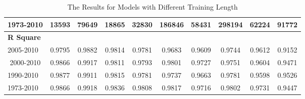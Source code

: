 \documentclass[a4paper,reqno,]{article}
\begin{document}
\begin{enumerate}
\begin{table}[H]
\begin{tabular}{lccccccccc}
    1973-2010 & \cellcolor[rgb]{ .447,  .769,  .533}13593 & \cellcolor[rgb]{ .408,  .753,  .502}79649 & \cellcolor[rgb]{ .388,  .745,  .482}18865 & \cellcolor[rgb]{ .702,  .871,  .753}32830 & \cellcolor[rgb]{ .506,  .792,  .584}186846 & \cellcolor[rgb]{ .604,  .831,  .667}58431 & \cellcolor[rgb]{ .388,  .745,  .482}298194 & \cellcolor[rgb]{ .388,  .745,  .482}62224 & \cellcolor[rgb]{ .667,  .855,  .722}91772 \\
    \midrule
	\textbf{R Square} &       &       &       &       &       &       &       &       &  \\
    2005-2010 & \cellcolor[rgb]{ .988,  .988,  1}0.9795 & \cellcolor[rgb]{ .988,  .988,  1}0.9882 & \cellcolor[rgb]{ .922,  .961,  .945}0.9814 & \cellcolor[rgb]{ .976,  .984,  .992}0.9781 & \cellcolor[rgb]{ .988,  .988,  1}0.9683 & \cellcolor[rgb]{ .988,  .988,  1}0.9609 & \cellcolor[rgb]{ .988,  .988,  1}0.9744 & \cellcolor[rgb]{ .929,  .965,  .949}0.9612 & \cellcolor[rgb]{ .988,  .988,  1}0.9152 \\
    \multicolumn{1}{c}{2000-2010} & \cellcolor[rgb]{ .471,  .78,  .553}0.9866 & \cellcolor[rgb]{ .396,  .749,  .49}0.9917 & \cellcolor[rgb]{ .988,  .988,  1}0.9811 & \cellcolor[rgb]{ .714,  .878,  .765}0.9793 & \cellcolor[rgb]{ .463,  .776,  .549}0.9801 & \cellcolor[rgb]{ .388,  .745,  .482}0.9727 & \cellcolor[rgb]{ .914,  .961,  .937}0.9751 & \cellcolor[rgb]{ .965,  .98,  .98}0.9604 & \cellcolor[rgb]{ .478,  .784,  .561}0.9471 \\
    1990-2010 & \cellcolor[rgb]{ .388,  .745,  .482}0.9877 & \cellcolor[rgb]{ .514,  .796,  .588}0.9911 & \cellcolor[rgb]{ .91,  .957,  .933}0.9815 & \cellcolor[rgb]{ .988,  .988,  1}0.9781 & \cellcolor[rgb]{ .745,  .89,  .792}0.9737 & \cellcolor[rgb]{ .718,  .878,  .769}0.9663 & \cellcolor[rgb]{ .604,  .831,  .667}0.9781 & \cellcolor[rgb]{ .988,  .988,  1}0.9598 & \cellcolor[rgb]{ .388,  .745,  .482}0.9526 \\
    1973-2010 & \cellcolor[rgb]{ .467,  .776,  .549}0.9866 & \cellcolor[rgb]{ .388,  .745,  .482}0.9918 & \cellcolor[rgb]{ .388,  .745,  .482}0.9836 & \cellcolor[rgb]{ .388,  .745,  .482}0.9808 & \cellcolor[rgb]{ .388,  .745,  .482}0.9817 & \cellcolor[rgb]{ .447,  .773,  .533}0.9716 & \cellcolor[rgb]{ .388,  .745,  .482}0.9802 & \cellcolor[rgb]{ .388,  .745,  .482}0.9731 & \cellcolor[rgb]{ .518,  .8,  .596}0.9447 \\
    \bottomrule
    \end{tabular}
  \caption{The Results for Models with Different Training Length}
  \label{tab:ann_dtl}
\end{table}

\end{enumerate}
\end{document}
